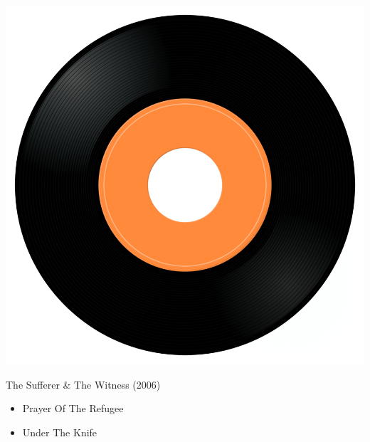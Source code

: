 \begin{minipage}[t]{0.25\textwidth}\vspace{0pt}
\captionsetup{type=figure}
\includegraphics[width=\textwidth]{Images/cover.png}
\caption*{The Sufferer \& The Witness (2006)}
\end{minipage}
\begin{minipage}[t]{0.25\textwidth}\vspace{0pt}
\begin{itemize}[nosep,leftmargin=1em,labelwidth=*,align=left]
	\setlength{\itemsep}{0pt}
	\item Prayer Of The Refugee
	\item Under The Knife
\end{itemize}
\end{minipage}
